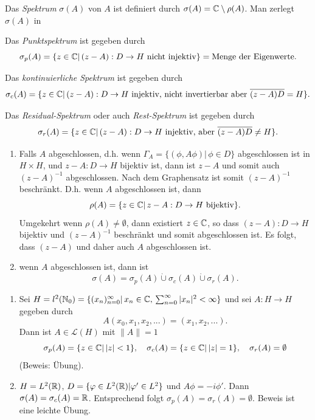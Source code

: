 \documentclass{mycourse}
\begin{document}
Das \emph{Spektrum} $\sigma(A)$ von $A$ ist definiert durch $\sigma(A)=\mathbb{C}\setminus \rho(A)$. Man zerlegt $\sigma(A)$ in
\begin{seg}[Punktsprektum]
Das \emph{Punktspektrum} ist gegeben durch
\[
\sigma_p(A)=\{z\in \mathbb{C} |\, (z-A): D\to H \text{ nicht injektiv}\}= \text{Menge der Eigenwerte.}
\]
\end{seg}
\begin{seg}
Das \emph{kontinuierliche Spektrum} ist gegeben durch
\[
\sigma_c(A)=\{z\in \mathbb{C}|\, (z-A): D\to H \text{ injektiv, nicht invertierbar aber } \overline{(z-A)D}= H\}.
\]
\end{seg}
\begin{seg}
Das \emph{Residual-Spektrum} oder auch \emph{Rest-Spektrum} ist gegeben durch
\[
\sigma_r(A)=\{z\in \mathbb{C}|\, (z-A):D \to H \text{ injektiv, aber } \overline{(z-A)D}\neq H\}.
\]
\end{seg}
\begin{nt*}
\begin{enumerate}[1)]
\item Falls $A$ abgeschlossen, d.h. wenn $\Gamma_A= \{(\phi, A\phi)|\, \phi \in D\}$ abgeschlossen ist in $H\times H$, und $z-A: D \to H$ bijektiv ist, dann ist $z-A$ und somit auch $(z-A)^{-1}$ abgeschlossen. Nach dem Graphensatz ist somit $(z-A)^{-1}$ beschränkt. D.h. wenn $A$ abgeschlossen ist, dann 
\[
\rho(A)=\{z\in \mathbb{C}|\, z-A: D \to H \text{ bijektiv}\}.
\]
Umgekehrt wenn $\rho(A)\neq \emptyset$, dann existiert $z\in \mathbb{C}$, so dass $(z-A):D\to H$ bijektiv und $(z-A)^{-1}$ beschränkt und somit abgeschlossen ist. Es folgt, dass $(z-A)$ und daher auch $A$ abgeschlossen ist.
\item wenn $A$ abgeschlossen ist, dann ist
\[
\sigma(A)=\sigma_p(A) \dot\cup \sigma_c(A) \dot\cup \sigma_r(A).
\]
\end{enumerate}
\end{nt*}
\begin{ex*}
\begin{enumerate}[1)]
\item Sei $H= l^2(\mathbb{N}_0)=\{(x_n)_{n=0}^\infty |\, x_n \in \mathbb{C},\, \sum_{n=0}^\infty|x_n|^2<\infty\}$ und sei $A: H\to H$ gegeben durch 
\[
A(x_0, x_1, x_2,...)=(x_1, x_2,...).
\]
Dann ist $A\in \mathcal L(H)$ mit $\|A\|=1$
\[
\sigma_p(A)=\{z\in \mathbb{C}|\, |z|<1\}, \quad \sigma_c(A)=\{z\in \mathbb{C}|\, |z|=1\}, \quad \sigma_r(A)=\emptyset
\]
(Beweis: Übung).
\item $H=L^2(\mathbb{R})$, $D=\{\varphi\in L^2(\mathbb{R})| \varphi'\in L^2\}$ und $A\phi=-i \phi'$. Dann $\sigma(A)=\sigma_c(A)=\mathbb{R}$. Entsprechend folgt $\sigma_p(A)=\sigma_r(A)= \emptyset$. Beweis ist eine leichte Übung.
\end{enumerate}
\end{ex*}
\end{document}
